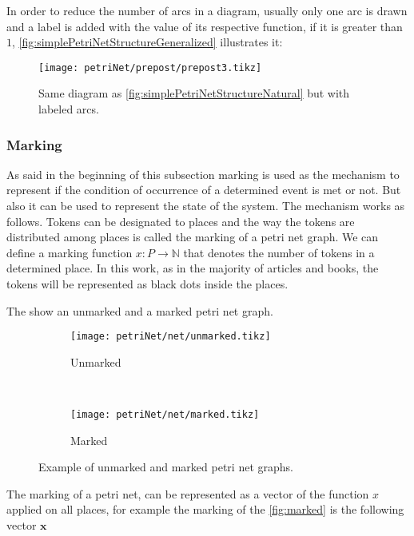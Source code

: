 In order to reduce the number of arcs in a diagram, usually only one arc is
drawn and a label is added with the value of its respective function, if it is
greater than $1$, \autoref{fig:simplePetriNetStructureGeneralized} illustrates it:
\begin{figure}[H]
  \centering
  \texttt{[image: petriNet/prepost/prepost3.tikz]}
  \caption{Same diagram as \autoref{fig:simplePetriNetStructureNatural} but with
    labeled arcs.}
\label{fig:simplePetriNetStructureGeneralized}
\end{figure}

\subsubsection{Marking}
\label{sec:marking}

As said in the beginning of this subsection marking is used as the mechanism to
represent if the condition of occurrence of a determined event is met or not.
But also it can be used to represent the state of the system. The mechanism
works as follows. Tokens can be designated to places and the way the tokens are
distributed among places is called the marking of a petri net graph. We can define a marking function $x :
P \rightarrow \mathbb{N}$ that denotes the number of tokens in a determined place.
In this
work, as in the majority of articles and books, the tokens will be
represented as black dots inside the places. 

The
 show an unmarked and a marked petri net graph.
\begin{figure}[H]
\begin{subfigure}[t]{0.45\textwidth}
  \centering
  \texttt{[image: petriNet/net/unmarked.tikz]}
  \caption{Unmarked}
  \label{fig:unmarked}
\end{subfigure}
~
\begin{subfigure}[t]{0.45\textwidth}
  \centering
  \texttt{[image: petriNet/net/marked.tikz]}
  \caption{Marked}
  \label{fig:marked}
\end{subfigure}
\caption{Example of unmarked and marked petri net graphs.}
\end{figure}

The marking of a petri net, can be represented as a
vector of the function $x$ applied on all places, for example the marking of the
\autoref{fig:marked} is the following vector $\mathbf{x}$

